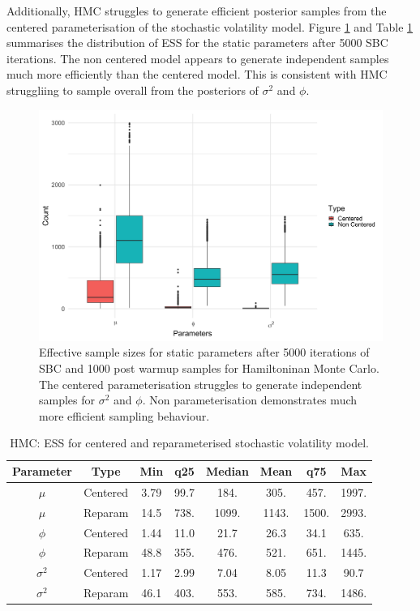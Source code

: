 \documentclass[12pt, a4paper]{article}
\begin{document}
    Additionally, HMC struggles to generate efficient posterior samples from the centered parameterisation of the stochastic volatility model. Figure \ref{fig:hmcess} and Table \ref{tab:hmcess} summarises the distribution of ESS for the static parameters after 5000 SBC iterations. The non centered model appears to generate independent samples much more efficiently than the centered model. This is consistent with HMC struggliing to sample overall from the posteriors of $\sigma^2$ and $\phi$.

    \begin{figure}[H]
        \centering
        \includegraphics[scale=0.09]{results/hmc_ess.png}
        \caption{Effective sample sizes for static parameters after 5000 iterations of SBC and 1000 post warmup samples for Hamiltoninan Monte Carlo. The centered parameterisation struggles to generate independent samples for $\sigma^2$ and $\phi$. Non parameterisation demonstrates much more efficient sampling behaviour.}
        \label{fig:hmcess}
    \end{figure}

    \begin{table}[H]
        \centering
        \begin{tabular}{|c|c|c|c|c|c|c|c|} \hline 
        Parameter &  Type&Min& q25&  Median& Mean & q75&Max\\ \hline 
        $\mu$&  Centered&3.79 & 99.7 & 184. & 305. & 457. & 1997.  \\
     $\mu$&  Reparam&14.5 & 738. & 1099. & 1143. & 1500. & 2993.  \\\hline 
     $\phi$&  Centered&1.44 & 11.0 & 21.7 & 26.3 & 34.1 & 635.  \\
     $\phi$&  Reparam&48.8 & 355. & 476. & 521. & 651. & 1445.   \\ \hline 
     $\sigma^2$&  Centered& 1.17 & 2.99 & 7.04 & 8.05 & 11.3 & 90.7 \\ 
     $\sigma^2$&  Reparam&46.1 & 403. & 553. & 585. & 734. & 1486. \\ \hline
        \end{tabular}
        \caption{HMC: ESS for centered and reparameterised stochastic volatility model.}
        \label{tab:hmcess}
    \end{table}
\end{document}
